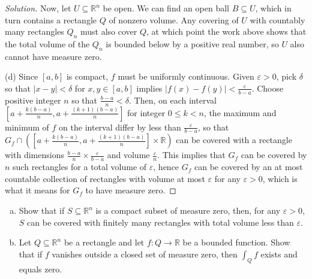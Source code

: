 \documentclass[10pt]{scrartcl}
\providecommand{\eps}{\varepsilon}
\providecommand{\RR}{\mathbb R}
\providecommand{\ii}{\item}
\newenvironment{soln}{\begin{proof}[Solution]}{\end{proof}}
\begin{document}
\begin{soln}
	Now, let $U\subseteq\RR^n$ be open. We can find an open ball
	$B\subseteq U$, which in turn contains a rectangle $Q$ of nonzero volume.
	Any covering of $U$ with countably many rectangles $Q_n$
	must also cover $Q$, at which point the work above shows that
	the total volume of the $Q_n$ is bounded below by a positive real number,
	so $U$ also cannot have measure zero.
	
	(d) Since $[a,b]$ is compact, $f$ must be uniformly continuous.
	Given $\eps>0$, pick $\delta$ so that $|x-y|<\delta$
	for $x,y\in[a,b]$ implies $|f(x)-f(y)|<\frac{\eps}{b-a}$.
	Choose positive integer $n$ so that $\frac{b-a}n<\delta$.
	Then, on each interval $[a+\frac{k(b-a)}{n},a+\frac{(k+1)(b-a)}{n}]$
	for integer $0\le k<n$, the maximum and minimum of $f$
	on the interval differ by less than $\frac{\eps}{b-a}$,
	so that $G_f\cap([a+\frac{k(b-a)}{n},a+\frac{(k+1)(b-a)}{n}]\times\RR)$
	can be covered with a rectangle with dimensions
	$\frac{b-a}{n}\times\frac{\eps}{b-a}$ and volume $\frac{\eps}{n}$.
	This implies that $G_f$ can be covered by $n$ such rectangles
	for a total volume of $\eps$, hence $G_f$ can be covered by
	an at most countable collection of rectangles with volume at most $\eps$
	for any $\eps>0$, which is what it means for $G_f$ to have measure zero.
\end{soln}

\begin{problem}
	\begin{enumerate}[(a)]
		\ii Show that if $S\subseteq\RR^n$ is a compact subset of measure zero,
		then, for any $\eps > 0$, $S$ can be covered with
		finitely many rectangles with total volume less than $\eps$.
		\ii Let $Q\subseteq\RR^n$ be a rectangle and let $f\colon Q\to\RR$
		be a bounded function. Show that if $f$ vanishes outside
		a closed set of measure zero, then $\int_Qf$ exists and equals zero.
	\end{enumerate}
\end{problem}
\end{document}
